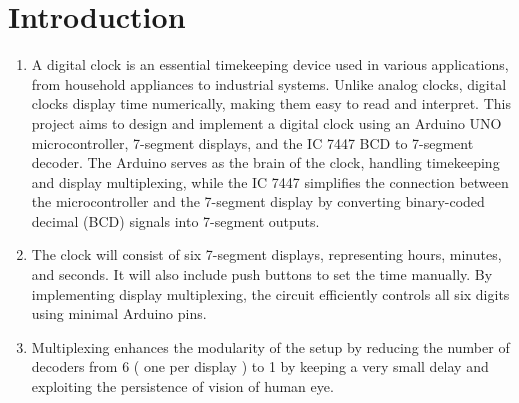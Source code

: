 \documentclass[journal]{IEEEtran}
\begin{document}
\section{Introduction}
\begin{enumerate}
\item A digital clock is an essential timekeeping device used in various applications, from household appliances to industrial systems. Unlike analog clocks, digital clocks display time numerically, making them easy to read and interpret. This project aims to design and implement a digital clock using an Arduino UNO microcontroller, 7-segment displays, and the IC 7447 BCD to 7-segment decoder. The Arduino serves as the brain of the clock, handling timekeeping and display multiplexing, while the IC 7447 simplifies the connection between the microcontroller and the 7-segment display by converting binary-coded decimal (BCD) signals into 7-segment outputs.
\item The clock will consist of six 7-segment displays, representing hours, minutes, and seconds. It will also include push buttons to set the time manually. By implementing display multiplexing, the circuit efficiently controls all six digits using minimal Arduino pins.
\item Multiplexing enhances the modularity of the setup by reducing the number of decoders from 6 ( one per display ) to 1 by keeping a very small delay and exploiting the persistence of vision of human eye.
\end{enumerate}

\end{document}
